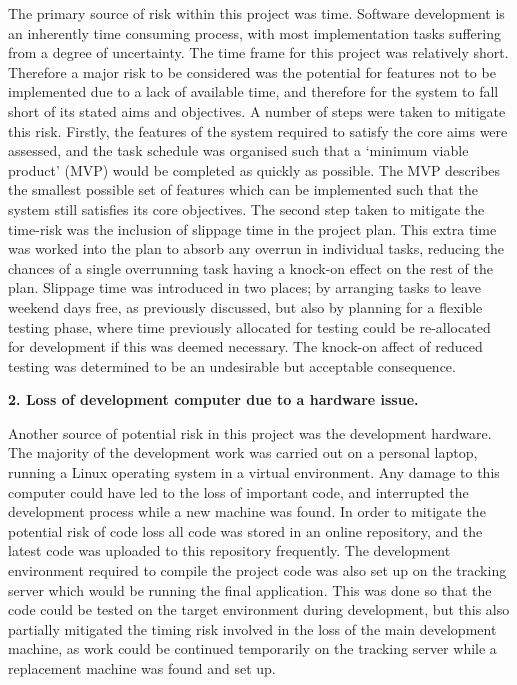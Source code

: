 The primary source of risk within this project was time. Software development is an inherently time consuming process, with most implementation tasks suffering from a degree of uncertainty. The time frame for this project was relatively short. Therefore a major risk to be considered was the potential for features not to be implemented due to a lack of available time, and therefore for the system to fall short of its stated aims and objectives. A number of steps were taken to mitigate this risk. Firstly, the features of the system required to satisfy the core aims were assessed, and the task schedule was organised such that a `minimum viable product' (MVP) would be completed as quickly as possible. The MVP describes the smallest possible set of features which can be implemented such that the system still satisfies its core objectives. The second step taken to mitigate the time-risk was the inclusion of slippage time in the project plan. This extra time was worked into the plan to absorb any overrun in individual tasks, reducing the chances of a single overrunning task having a knock-on effect on the rest of the plan. Slippage time was introduced in two places; by arranging tasks to leave weekend days free, as previously discussed, but also by planning for a flexible testing phase, where time previously allocated for testing could be re-allocated for development if this was deemed necessary. The knock-on affect of reduced testing was determined to be an undesirable but acceptable consequence.

\noindent\textbf{2. Loss of development computer due to a hardware issue.}

Another source of potential risk in this project was the development hardware. The majority of the development work was carried out on a personal laptop, running a Linux operating system in a virtual environment. Any damage to this computer could have led to the loss of important code, and interrupted the development process while a new machine was found. In order to mitigate the potential risk of code loss all code was stored in an online repository, and the latest code was uploaded to this repository frequently. The development environment required to compile the project code was also set up on the tracking server which would be running the final application. This was done so that the code could be tested on the target environment during development, but this also partially mitigated the timing risk involved in the loss of the main development machine, as work could be continued temporarily on the tracking server while a replacement machine was found and set up.

